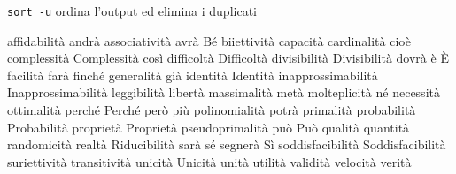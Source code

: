 \texttt{sort -u} ordina l'output ed elimina i duplicati

affidabilità
andrà
associatività
avrà
Bé
biiettività
capacità
cardinalità
cioè
complessità
Complessità
così
difficoltà
Difficoltà
divisibilità
Divisibilità
dovrà
è
È
facilità
farà
finché
generalità
già
identità
Identità
inapprossimabilità
Inapprossimabilità
leggibilità
libertà
massimalità
metà
molteplicità
né
necessità
ottimalità
perché
Perché
però
più
polinomialità
potrà
primalità
probabilità
Probabilità
proprietà
Proprietà
pseudoprimalità
può
Può
qualità
quantità
randomicità
realtà
Riducibilità
sarà
sé
segnerà
Sì
soddisfacibilità
Soddisfacibilità
suriettività
transitività
unicità
Unicità
unità
utilità
validità
velocità
verità
